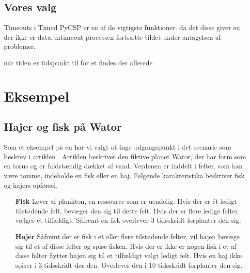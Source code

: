 \subsection{Vores valg}

Timeouts i Timed PyCSP er en af de vigtigste funktioner, da det disse
giver en der ikke er data, mtimeout processen fortsætte tildet under
antagelsen af problemer.

når tiden er tidspunkt til for et findes der allerede 



\section{Eksempel}


\subsection{Hajer og fisk på Wator} Som et eksempel på en \des har vi valgt at 
tage  udgangspunkt i det scenarie som \citeauthor{wator}
beskrev i artiklen \cite{wator}.  Artiklen beskriver den
fiktive planet Wator, der har form som en torus og er fuldstændig
dækket af vand. Verdenen er inddelt i felter, som kan være tomme, indeholde en
fisk eller en haj\cite[20]{wator}. Følgende karakteristika beskriver fisk og hajers
opførsel.

\begin{itemize}
\item[\textbf{Fisk}]
Lever af plankton, en ressource som er uendelig. Hvis der er ét ledigt 
tilstødende felt, bevæger den sig til dette felt. Hvis der er flere ledige 
felter vælges et tilfældigt. Såfremt en fisk overlever 3 tidsskridt forplanter 
den sig.
\item[\textbf{Hajer}]
Såfremt der er fisk i et eller flere tilstødende felter, vil hajen bevæge sig 
til et af disse felter og spise fisken. Hvis der er ikke er nogen fisk i et af 
disse felter flytter hajen sig til et tilfældigt valgt ledigt felt. Hvis en haj 
ikke spiser i 3 tidsskridt dør den. Overlever den i 10 tidsskridt forplanter 
den sig.
\end{itemize}

